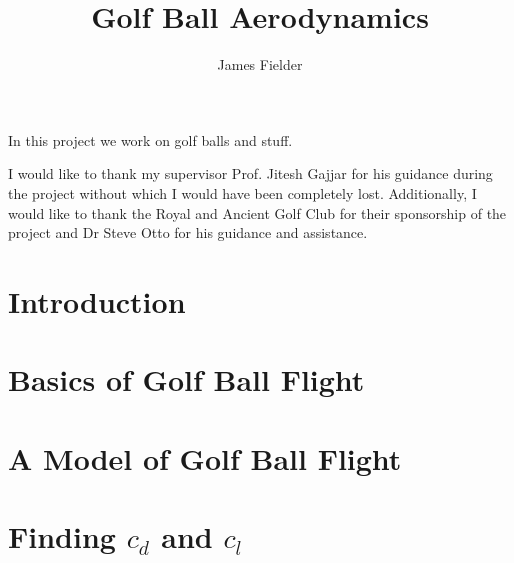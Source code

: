 \documentclass[12pt,MSc,twoside]{muthesis}
\numberwithin{equation}{section}
\begin{document}
\title{Golf Ball Aerodynamics}
\author{James Fielder}
\def\wordcount{xxxxx}




\beforeabstract

In this project we work on golf balls and stuff.

\afterabstract

I would like to thank my supervisor Prof. Jitesh Gajjar for his guidance during the project without 
which I would have been completely lost. Additionally, I would like to thank the Royal and Ancient 
Golf Club for their sponsorship of the project and Dr Steve Otto for his guidance and assistance.

\afterpreface


\pagestyle{normal}
\chapter{Introduction}


\chapter{Basics of Golf Ball Flight}


\chapter{A Model of Golf Ball Flight}


\chapter{Finding $c_{d}$ and $c_{l}$}

\end{document}
